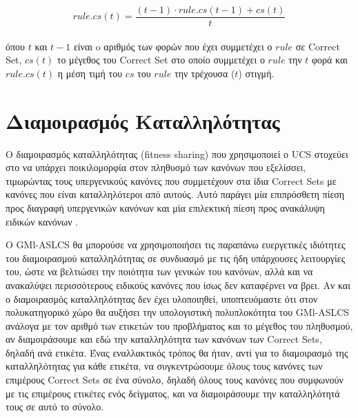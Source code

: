 \begin{equation}
rule.cs(t) = \frac{(t-1) \cdot rule.cs(t-1) + cs(t)}{t}
\end{equation}
\\
όπου $t$ και $t-1$ είναι o αριθμός των φορών που έχει συμμετέχει ο $rule$ σε Correct Set, $cs(t)$ το μέγεθος του Correct Set στο οποίο συμμετέχει ο $rule$ την $t$ φορά και $rule.cs(t)$ η μέση τιμή του $cs$ του $rule$ την τρέχουσα ($t$) στιγμή.
 

\section{Διαμοιρασμός Καταλληλότητας}
Ο διαμοιρασμός καταλληλότητας (fitness sharing) που χρησιμοποιεί ο UCS στοχεύει στο να υπάρχει ποικιλομορφία στον πληθυσμό των κανόνων που εξελίσσει, τιμωρώντας τους υπεργενικούς κανόνες που συμμετέχουν στα ίδια Correct Sets με κανόνες που είναι καταλληλότεροι από αυτούς. Αυτό παράγει μία επιπρόσθετη πίεση προς διαγραφή υπεργενικών κανόνων και μία επιλεκτική πίεση προς ανακάλυψη ειδικών κανόνων \cite{orriols2008revisiting}. 

Ο GMl-ASLCS θα μπορούσε να χρησιμοποιήσει τις παραπάνω ευεργετικές ιδιότητες του διαμοιρασμού καταλληλότητας σε συνδυασμό με τις ήδη υπάρχουσες λειτουργίες του, ώστε να βελτιώσει την ποιότητα των γενικών του κανόνων, αλλά και να ανακαλύψει περισσότερους ειδικούς κανόνες που ίσως δεν καταφέρνει να βρει. Αν και ο διαμοιρασμός καταλληλότητας δεν έχει υλοποιηθεί, υποπτευόμαστε ότι στον πολυκατηγορικό χώρο θα αυξήσει την υπολογιστική πολυπλοκότητα του GMl-ASLCS ανάλογα με τον αριθμό των ετικετών του προβλήματος και το μέγεθος του πληθυσμού, αν διαμοιράσουμε και εδώ την καταλληλότητα των κανόνων των Correct Sets, δηλαδή ανά ετικέτα. Ένας εναλλακτικός τρόπος θα ήταν, αντί για το διαμοιρασμό της καταλληλότητας για κάθε ετικέτα, να συγκεντρώσουμε όλους τους κανόνες των επιμέρους Correct Sets σε ένα σύνολο, δηλαδή όλους τους κανόνες που συμφωνούν με τις επιμέρους ετικέτες ενός δείγματος, και να διαμοιράσουμε την καταλληλότητά τους σε αυτό το σύνολο.

